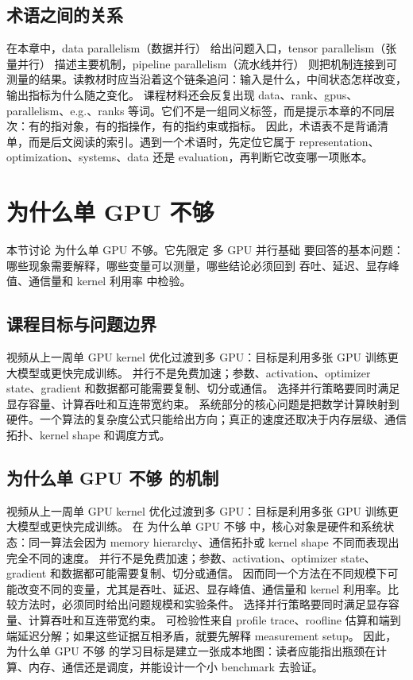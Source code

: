 \documentclass[a4paper]{article}
\begin{document}
\subsection{术语之间的关系}
在本章中，data parallelism（数据并行） 给出问题入口，tensor parallelism（张量并行） 描述主要机制，pipeline parallelism（流水线并行） 则把机制连接到可测量的结果。读教材时应当沿着这个链条追问：输入是什么，中间状态怎样改变，输出指标为什么随之变化。
课程材料还会反复出现 data、rank、gpus、parallelism、e.g.、ranks 等词。它们不是一组同义标签，而是提示本章的不同层次：有的指对象，有的指操作，有的指约束或指标。
因此，术语表不是背诵清单，而是后文阅读的索引。遇到一个术语时，先定位它属于 representation、optimization、systems、data 还是 evaluation，再判断它改变哪一项账本。
\section{为什么单 GPU 不够}
本节讨论 为什么单 GPU 不够。它先限定 多 GPU 并行基础 要回答的基本问题：哪些现象需要解释，哪些变量可以测量，哪些结论必须回到 吞吐、延迟、显存峰值、通信量和 kernel 利用率 中检验。
\subsection{课程目标与问题边界}
视频从上一周单 GPU kernel 优化过渡到多 GPU：目标是利用多张 GPU 训练更大模型或更快完成训练。
并行不是免费加速；参数、activation、optimizer state、gradient 和数据都可能需要复制、切分或通信。
选择并行策略要同时满足显存容量、计算吞吐和互连带宽约束。
系统部分的核心问题是把数学计算映射到硬件。一个算法的复杂度公式只能给出方向；真正的速度还取决于内存层级、通信拓扑、kernel shape 和调度方式。
\subsection{为什么单 GPU 不够 的机制}
视频从上一周单 GPU kernel 优化过渡到多 GPU：目标是利用多张 GPU 训练更大模型或更快完成训练。 在 为什么单 GPU 不够 中，核心对象是硬件和系统状态：同一算法会因为 memory hierarchy、通信拓扑或 kernel shape 不同而表现出完全不同的速度。
并行不是免费加速；参数、activation、optimizer state、gradient 和数据都可能需要复制、切分或通信。 因而同一个方法在不同规模下可能改变不同的变量，尤其是吞吐、延迟、显存峰值、通信量和 kernel 利用率。比较方法时，必须同时给出问题规模和实验条件。
选择并行策略要同时满足显存容量、计算吞吐和互连带宽约束。 可检验性来自 profile trace、roofline 估算和端到端延迟分解；如果这些证据互相矛盾，就要先解释 measurement setup。
因此，为什么单 GPU 不够 的学习目标是建立一张成本地图：读者应能指出瓶颈在计算、内存、通信还是调度，并能设计一个小 benchmark 去验证。
\end{document}
